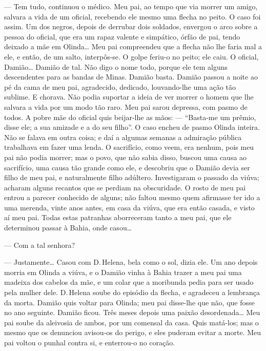 --- Tem tudo, continuou o médico. Meu pai, ao tempo que via morrer um
amigo, salvara a vida de um oficial, recebendo ele mesmo uma flecha no
peito. O caso foi assim. Um dos negros, depois de derrubar dois
soldados, envergou o arco sobre a pessoa do oficial, que era um rapaz
valente e simpático, órfão de pai, tendo deixado a mãe em Olinda\ldots{} Meu
pai compreendeu que a flecha não lhe faria mal a ele, e então, de um
salto, interpôs-se. O golpe feriu-o no peito; ele caiu. O oficial,
Damião\ldots{} Damião de tal. Não digo o nome todo, porque ele tem alguns
descendentes para as bandas de Minas. Damião basta. Damião passou a
noite ao pé da cama de meu pai, agradecido, dedicado, louvando-lhe uma
ação tão sublime. E chorava. Não podia suportar a ideia de ver morrer o
homem que lhe salvara a vida por um modo tão raro. Meu pai sarou
depressa, com pasmo de todos. A pobre mãe do oficial quis beijar-lhe as
mãos: --- ``Basta-me um prêmio, disse ele; a sua amizade e a do seu
filho''. O caso encheu de pasmo Olinda inteira. Não se falava em outra
coisa; e daí a algumas semanas a admiração pública trabalhava em fazer
uma lenda. O sacrifício, como veem, era nenhum, pois meu pai não podia
morrer; mas o povo, que não sabia disso, buscou uma causa ao sacrifício,
uma causa tão grande como ele, e descobriu que o Damião devia ser filho
de meu pai, e naturalmente filho adúltero. Investigaram o passado da
viúva; acharam alguns recantos que se perdiam na obscuridade. O rosto de
meu pai entrou a parecer conhecido de alguns; não faltou mesmo quem
afirmasse ter ido a uma merenda, vinte anos antes, em casa da viúva, que
era então casada, e visto aí meu pai. Todas estas patranhas aborreceram
tanto a meu pai, que ele determinou passar à Bahia, onde casou\ldots{}

--- Com a tal senhora?

--- Justamente\ldots{} Casou com D.\,Helena, bela como o sol, dizia ele. Um
ano depois morria em Olinda a viúva, e o Damião vinha à Bahia trazer a
meu pai uma madeixa dos cabelos da mãe, e um colar que a moribunda pedia
para ser usado pela mulher dele. D.\,Helena soube do episódio da flecha,
e agradeceu a lembrança da morta. Damião quis voltar para Olinda; meu
pai disse-lhe que não, que fosse no ano seguinte. Damião ficou. Três
meses depois uma paixão desordenada\ldots{} Meu pai soube da aleivosia de
ambos, por um comensal da casa. Quis matá-los; mas o mesmo que os
denunciou avisou-os do perigo, e eles puderam evitar a morte. Meu pai
voltou o punhal contra si, e enterrou-o no coração.

